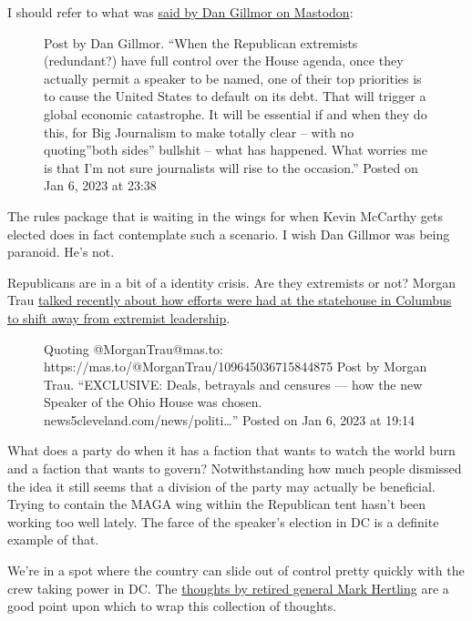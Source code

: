 I should refer to what was
\href{https://mastodon.social/@dangillmor/109646074425667878}{said by
Dan Gillmor on Mastodon}:

\begin{figure}
\centering
{}
\caption{Post by Dan Gillmor. ``When the Republican extremists
(redundant?) have full control over the House agenda, once they actually
permit a speaker to be named, one of their top priorities is to cause
the United States to default on its debt. That will trigger a global
economic catastrophe. It will be essential if and when they do this, for
Big Journalism to make totally clear -- with no quoting''both sides''
bullshit -- what has happened. What worries me is that I'm not sure
journalists will rise to the occasion.'' Posted on Jan 6, 2023 at 23:38}
\end{figure}

The rules package that is waiting in the wings for when Kevin McCarthy
gets elected does in fact contemplate such a scenario. I wish Dan
Gillmor was being paranoid. He's not.

Republicans are in a bit of a identity crisis. Are they extremists or
not? Morgan Trau
\href{https://mas.to/@MorganTrau/109645036715844875}{talked recently
about how efforts were had at the statehouse in Columbus to shift away
from extremist leadership}.

\begin{figure}
\centering
{}
\caption{Quoting @MorganTrau@mas.to:
https://mas.to/@MorganTrau/109645036715844875 Post by Morgan Trau.
``EXCLUSIVE: Deals, betrayals and censures --- how the new Speaker of
the Ohio House was chosen. news5cleveland.com/news/politi\ldots{}''
Posted on Jan 6, 2023 at 19:14}
\end{figure}

What does a party do when it has a faction that wants to watch the world
burn and a faction that wants to govern? Notwithstanding how much people
dismissed the idea it still seems that a division of the party may
actually be beneficial. Trying to contain the MAGA wing within the
Republican tent hasn't been working too well lately. The farce of the
speaker's election in DC is a definite example of that.

We're in a spot where the country can slide out of control pretty
quickly with the crew taking power in DC. The
\href{https://mstdn.social/@markhertling/109646168091186531}{thoughts by
retired general Mark Hertling} are a good point upon which to wrap this
collection of thoughts.

